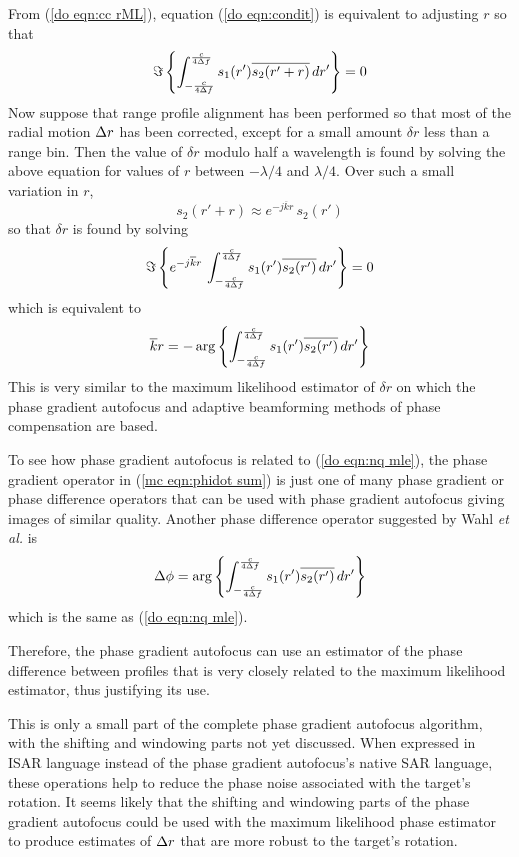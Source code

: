 From (\ref{do eqn:cc rML}), equation (\ref{do eqn:condit}) is equivalent 
to adjusting $r$ so that
\begin{equation}
\Im\left\{\int_{-\frac{c}{4{\Delta f}}}^{\frac{c}{4{\Delta f}}}
s_1(r')\overline{s_2(r'+r)}\,dr'\right\}=0
\end{equation}
Now suppose that range profile alignment has been performed so that most of
the radial motion ${\Delta r}$ has been corrected, except for a small amount
$\delta r$ less than a range bin.  Then the value of $\delta r$ modulo half
a wavelength is found by solving the above equation for values of $r$
between $-\lambda/4$ and $\lambda/4$.  Over such a small variation in $r$,
\begin{equation}
s_2(r'+r)\approx e^{-j\overline{k}r}\,s_2(r')
\end{equation}
so that $\delta r$ is found by solving
\begin{equation}
\Im\left\{e^{-j\overline{k}r}\,\int_{-\frac{c}{4{\Delta f}}}^{\frac{c}{4{\Delta f}}}
s_1(r')\overline{s_2(r')}\,dr'\right\}=0
\end{equation}
which is equivalent to
\begin{equation}
\label{do eqn:nq mle}
\overline{k}r=
-\arg\left\{\int_{-\frac{c}{4{\Delta f}}}^{\frac{c}{4{\Delta f}}}
s_1(r')\overline{s_2(r')}\,dr'\right\}
\end{equation}
This is very similar to the maximum likelihood estimator of $\delta r$ on which
the phase gradient autofocus and adaptive beamforming methods of phase
compensation are based.


To see how phase gradient autofocus is related to (\ref{do eqn:nq mle}),
the phase gradient operator in (\ref{mc eqn:phidot sum}) is just one of
many phase gradient or phase difference operators that can be used with
phase gradient autofocus giving images of similar quality.  Another phase
difference operator suggested by Wahl {\em et al.\/} is \cite[eq. (5)]{Wah94}
\begin{equation}
\Delta\phi=
\arg\left\{\int_{-\frac{c}{4{\Delta f}}}^{\frac{c}{4{\Delta f}}}
s_1(r')\overline{s_2(r')}\,dr'\right\}
\end{equation}
which is the same as (\ref{do eqn:nq mle}). 

Therefore, the phase gradient autofocus can use an estimator of the phase
difference between profiles that is very closely related to the maximum
likelihood estimator, thus justifying its use.  

This is only a small part of the complete phase gradient autofocus
algorithm, with the shifting and windowing parts not yet discussed.  When
expressed in ISAR language instead of the phase gradient autofocus's native SAR language, these
operations help to reduce the phase noise associated with the target's
rotation.  It seems likely that the shifting and windowing parts of the
phase gradient autofocus could be used with the maximum likelihood phase
estimator to produce estimates of ${\Delta r}$ that are more robust to the
target's rotation.


